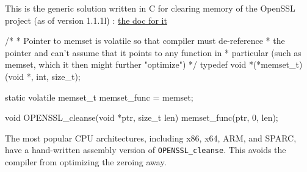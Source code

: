 This is the generic solution written in C for clearing memory of the OpenSSL project (as of version 1.1.1l) : \href{https://www.openssl.org/docs/man1.1.1/man3/OPENSSL_cleanse.html}{the doc for it}
\begin{ccode}
/*
 * Pointer to memset is volatile so that compiler must de-reference
 * the pointer and can't assume that it points to any function in
 * particular (such as memset, which it then might further "optimize")
 */
typedef void *(*memset_t)(void *, int, size_t);

static volatile memset_t memset_func = memset;

void OPENSSL_cleanse(void *ptr, size_t len)
{
    memset_func(ptr, 0, len);
}
\end{ccode}
The most popular CPU architectures, including x86, x64, ARM, and SPARC, have a hand-written assembly version of \texttt{OPENSSL\_cleanse}. This avoids the compiler from optimizing the zeroing away.